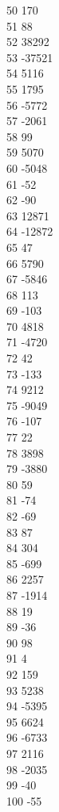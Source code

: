 { 50	170 \\
 51	88 \\
 52	38292 \\
 53	-37521 \\
 54	5116 \\
 55	1795 \\
 56	-5772 \\
 57	-2061 \\
 58	99 \\
 59	5070 \\
 60	-5048 \\
 61	-52 \\
 62	-90 \\
 63	12871 \\
 64	-12872 \\
 65	47 \\
 66	5790 \\
 67	-5846 \\
 68	113 \\
 69	-103 \\
 70	4818 \\
 71	-4720 \\
 72	42 \\
 73	-133 \\
 74	9212 \\
 75	-9049 \\
 76	-107 \\
 77	22 \\
 78	3898 \\
 79	-3880 \\
 80	59 \\
 81	-74 \\
 82	-69 \\
 83	87 \\
 84	304 \\
 85	-699 \\
 86	2257 \\
 87	-1914 \\
 88	19 \\
 89	-36 \\
 90	98 \\
 91	4 \\
 92	159 \\
 93	5238 \\
 94	-5395 \\
 95	6624 \\
 96	-6733 \\
 97	2116 \\
 98	-2035 \\
 99	-40 \\
 100	-55 \\
}
